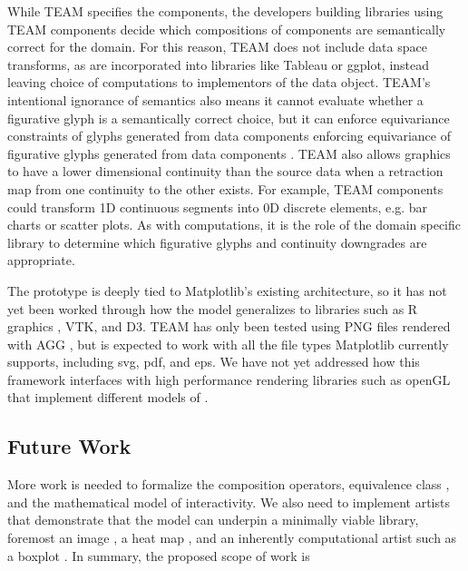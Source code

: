 \documentclass[../main.tex]{subfiles}
\begin{document}
While TEAM specifies the components, the developers building libraries using TEAM components decide which compositions of components are semantically correct for the domain. For this reason, TEAM does not include data space transforms, as are incorporated into libraries like Tableau or ggplot, instead leaving choice of computations to implementors of the data object. TEAM's intentional ignorance of semantics also means it cannot evaluate whether a figurative glyph \cite{byrneAcquiredCodesMeaning2016} is a semantically correct choice, but it can enforce equivariance constraints of glyphs generated from data components enforcing equivariance of figurative glyphs \cite{byrneAcquiredCodesMeaning2016} generated from data components \cite{beckfeathers2014,byrneFigurativeFramesCritical2017}. TEAM also allows graphics to have a lower dimensional continuity than the source data when a retraction map from one continuity to the other exists. For example, TEAM components could transform 1D continuous segments into 0D discrete elements, e.g. bar charts or scatter plots. As with computations, it is the role of the domain specific library to determine which figurative glyphs and continuity downgrades are appropriate. 

The prototype is deeply tied to Matplotlib's existing architecture, so it has not yet been worked through how the model generalizes to libraries such as R graphics \cite{murrellGraphicsThirdEdition2018}, VTK, and D3. TEAM has only been tested using PNG files rendered with AGG \cite{shemanarevAntiGrainGeometry}, but is expected to work with all the file types Matplotlib currently supports, including svg, pdf, and eps. We have not yet addressed how this framework interfaces with high performance rendering libraries such as openGL \cite{CarsonOpenGL1997} that implement different models of \gsection. 

\subsection{Future Work}
More work is needed to formalize the composition operators, equivalence class \vartisteq, and the mathematical model of interactivity. We also need to implement artists that demonstrate that the model can underpin a minimally viable library, foremost an image \cite{haber1990visualization,hansen2011visualization}, a heat map \cite{wilkinsonHistoryClusterHeat2009,loua1873atlas}, and an inherently computational artist such as a boxplot \cite{wickham40YearsBoxplots2011}. In summary, the proposed scope of work is
\end{document}
